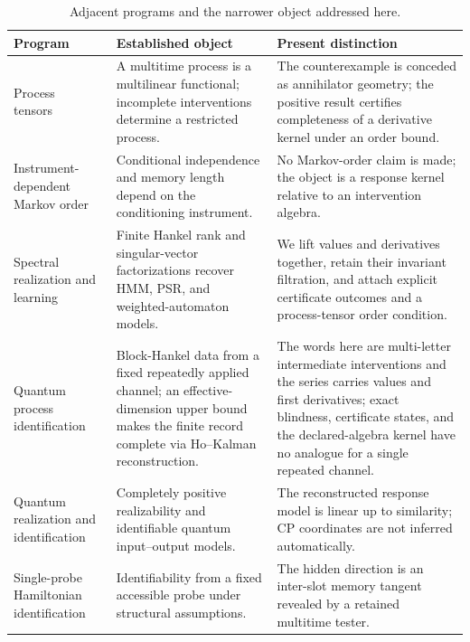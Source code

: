 \documentclass[aps,prl,reprint,superscriptaddress,nofootinbib]{revtex4-2}
\begin{document}
\begin{table}[t]
\caption{Adjacent programs and the narrower object addressed here.}
\label{tab:comparison}
\begin{tabular}{@{}lll@{}}
\toprule
\parbox[t]{0.20\linewidth}{Program} &
\parbox[t]{0.30\linewidth}{Established object} &
\parbox[t]{0.40\linewidth}{Present distinction}\\
\midrule
\parbox[t]{0.20\linewidth}{Process tensors~\cite{Pollock2018ProcessTensor,White2020ProcessControl,White2022ProcessTomography,Giarmatzi2025Multitime}} &
\parbox[t]{0.30\linewidth}{A multitime process is a multilinear functional; incomplete interventions determine a restricted process.} &
\parbox[t]{0.40\linewidth}{The counterexample is conceded as annihilator geometry; the positive result certifies completeness of a derivative kernel under an order bound.}\\[3pt]
\parbox[t]{0.20\linewidth}{Instrument-dependent Markov order~\cite{Taranto2019MarkovOrder}} &
\parbox[t]{0.30\linewidth}{Conditional independence and memory length depend on the conditioning instrument.} &
\parbox[t]{0.40\linewidth}{No Markov-order claim is made; the object is a response kernel relative to an intervention algebra.}\\[3pt]
\parbox[t]{0.20\linewidth}{Spectral realization and learning~\cite{Hsu2012HMM,Boots2011PSR,BalleMohri2012WFA,Balle2014WFA,BalleMohri2018WFA}} &
\parbox[t]{0.30\linewidth}{Finite Hankel rank and singular-vector factorizations recover HMM, PSR, and weighted-automaton models.} &
\parbox[t]{0.40\linewidth}{We lift values and derivatives together, retain their invariant filtration, and attach explicit certificate outcomes and a process-tensor order condition.}\\[3pt]
\parbox[t]{0.20\linewidth}{Quantum process identification~\cite{BenninkLougovski2019QPI}} &
\parbox[t]{0.30\linewidth}{Block-Hankel data from a fixed repeatedly applied channel; an effective-dimension upper bound makes the finite record complete via Ho--Kalman reconstruction.} &
\parbox[t]{0.40\linewidth}{The words here are multi-letter intermediate interventions and the series carries values and first derivatives; exact blindness, certificate states, and the declared-algebra kernel have no analogue for a single repeated channel.}\\[3pt]
\parbox[t]{0.20\linewidth}{Quantum realization and identification~\cite{MonrasWinter2016,GutaYamamoto2016}} &
\parbox[t]{0.30\linewidth}{Completely positive realizability and identifiable quantum input--output models.} &
\parbox[t]{0.40\linewidth}{The reconstructed response model is linear up to similarity; CP coordinates are not inferred automatically.}\\[3pt]
\parbox[t]{0.20\linewidth}{Single-probe Hamiltonian identification~\cite{SoneCappellaro2017}} &
\parbox[t]{0.30\linewidth}{Identifiability from a fixed accessible probe under structural assumptions.} &
\parbox[t]{0.40\linewidth}{The hidden direction is an inter-slot memory tangent revealed by a retained multitime tester.}\\
\bottomrule
\end{tabular}
\end{table}
\end{document}
